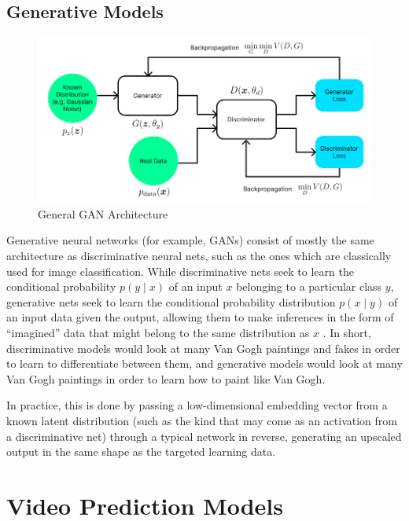 \documentclass{scrartcl}
\begin{document}
\subsection{Generative Models}
\label{subsec:generative}

\begin{figure}[H]
	\begin{center}
		\includegraphics[width=1\textwidth]{figures/gan_arch.png}
	\end{center}
	\caption{General GAN Architecture}
	\label{fig:rnn_arch}
\end{figure}

Generative neural networks (for example, GANs) consist of mostly the same
architecture as discriminative neural nets, such as the ones which are
classically used for image classification. While discriminative nets seek to
learn the conditional probability $p(y \mid x)$ of an input $x$ belonging to a
particular class $y$, generative nets seek to learn the conditional probability
distribution $p(x \mid y)$ of an input data given the output, allowing them to
make inferences in the form of ``imagined'' data that might belong to the same
distribution as $x$ \cite{gan_original}. In short, discriminative models would
look at many Van Gogh paintings and fakes in order to learn to differentiate
between them, and generative models would look at many Van Gogh paintings in
order to learn how to paint like Van Gogh.

In practice, this is done by passing a low-dimensional embedding vector from a
known latent distribution (such as the kind that may come as an activation from
a discriminative net) through a typical network in reverse, generating an
upscaled output in the same shape as the targeted learning data.

\section{Video Prediction Models}
\label{sec:families}
\end{document}
